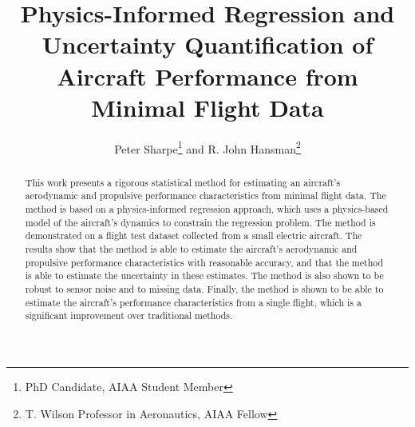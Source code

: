 \documentclass[conf]{new-aiaa}
\title{Physics-Informed Regression and Uncertainty Quantification of Aircraft Performance from Minimal Flight Data}
\author{Peter Sharpe\footnote{PhD Candidate, AIAA Student Member} and R. John Hansman\footnote{T. Wilson Professor in Aeronautics, AIAA Fellow}}
\affil{Massachusetts Institute of Technology, Cambridge, MA}
\begin{document}
    

    \maketitle

    \begin{abstract}

        This work presents a rigorous statistical method for estimating an aircraft's aerodynamic and propulsive performance characteristics from minimal flight data. The method is based on a physics-informed regression approach, which uses a physics-based model of the aircraft's dynamics to constrain the regression problem. The method is demonstrated on a flight test dataset collected from a small electric aircraft. The results show that the method is able to estimate the aircraft's aerodynamic and propulsive performance characteristics with reasonable accuracy, and that the method is able to estimate the uncertainty in these estimates. The method is also shown to be robust to sensor noise and to missing data. Finally, the method is shown to be able to estimate the aircraft's performance characteristics from a single flight, which is a significant improvement over traditional methods.

    \end{abstract}

%
\end{document}
